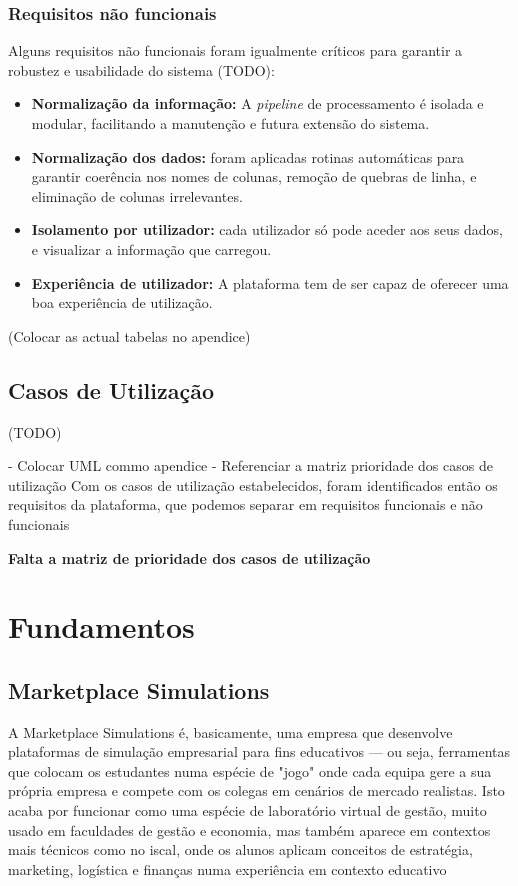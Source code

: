 \subsubsection{Requisitos não funcionais}

Alguns requisitos não funcionais foram igualmente críticos para garantir a robustez e usabilidade do sistema (TODO):

\begin{itemize}
    \item \textbf{Normalização da informação: } A \textit{pipeline} de processamento é isolada e modular, facilitando a manutenção e futura extensão do sistema.
    \item \textbf{Normalização dos dados:} foram aplicadas rotinas automáticas para garantir coerência nos nomes de colunas, remoção de quebras de linha, e eliminação de colunas irrelevantes.
    \item \textbf{Isolamento por utilizador:} cada utilizador só pode aceder aos seus dados, e visualizar a informação que carregou.
    \item \textbf{Experiência de utilizador:} A plataforma tem de  ser capaz de oferecer uma boa experiência de utilização.
\end{itemize}

(Colocar as actual tabelas no apendice)


\subsection{Casos de Utilização}
(TODO)

- Colocar UML commo apendice
- Referenciar a matriz prioridade dos casos de utilização
Com os casos de utilização estabelecidos, foram identificados então os requisitos da plataforma, que podemos separar em requisitos funcionais e não funcionais

\textbf{ Falta a matriz de prioridade dos casos de utilização}

\section{Fundamentos}
\label{sec:fundamentos}


\subsection{Marketplace Simulations}
A Marketplace Simulations é, basicamente, uma empresa que desenvolve plataformas de simulação empresarial para fins educativos — ou seja, ferramentas que colocam os estudantes numa espécie de "jogo" onde cada equipa gere a sua própria empresa e compete com os colegas em cenários de mercado realistas. Isto acaba por funcionar como uma espécie de laboratório virtual de gestão, muito usado em faculdades de gestão e economia, mas também aparece em contextos mais técnicos como no \gls{iscal}, onde os alunos aplicam conceitos de estratégia, marketing, logística e finanças numa experiência em contexto educativo

